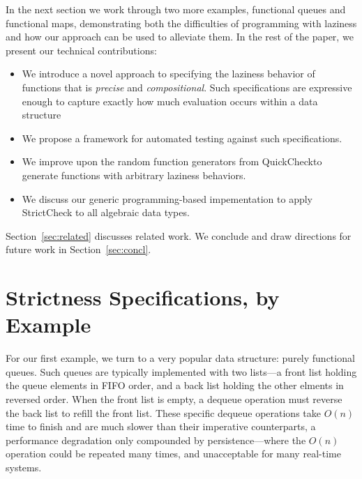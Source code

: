 \documentclass[acmsmall,review]{acmart}\settopmatter{}
\begin{document}
In the next section we work through two more examples, functional
queues and functional maps, demonstrating both the difficulties of
programming with laziness and how our approach can be used to
alleviate them.
%
In the rest of the paper, we present our technical contributions:
\begin{itemize}
\item We introduce a novel approach to specifying the laziness behavior
of functions that is {\em precise} and {\em compositional}. Such
specifications are expressive enough to capture exactly how much
evaluation occurs within a data structure
\item We propose a framework for automated testing against such specifications.
\item We improve upon the random function generators from QuickCheck\cn to generate functions with arbitrary laziness behaviors.
\item We discuss our generic programming-based impementation to apply StrictCheck to all algebraic data types.
\end{itemize}
%
Section~\ref{sec:related} discusses related work. We conclude and draw
directions for future work in Section~\ref{sec:concl}.

\section{Strictness Specifications, by Example}
\label{sec:quickchick}

For our first example, we turn to a very popular data structure:
purely functional queues.  Such queues are typically implemented with
two lists---a front list holding the queue elements in FIFO order, and
a back list holding the other elments in reversed order. When the
front list is empty, a dequeue operation must reverse the back list to
refill the front list. These specific dequeue operations take $O(n)$
time to finish and are much slower than their imperative
counterparts, a performance degradation only compounded by
persistence---where the $O(n)$ operation could be repeated many times,
and unacceptable for many real-time systems.
\end{document}
